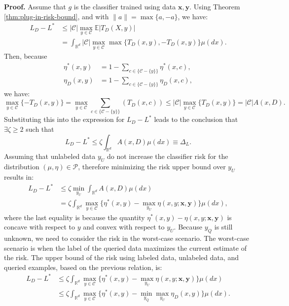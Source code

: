 	\textbf{Proof.} Assume that $g$ is the classifier trained using data $\mathbf{x}, \mathbf{y}$. Using Theorem \ref{thm:plug-in-risk-bound}, and with $\|a\| = \max\{a, -a\}$, we have:
	\begin{align}
		L_D - L^* &\le |\mathcal{C}| \max_{y \in \mathcal{C}} \mathbb{E}|T_D(X, y)| \\
		&= \int_{\mathbb{R}^d} |\mathcal{C}| \max_{y \in \mathcal{C}} \max\{T_D(x, y), -T_D(x, y)\} \mu(dx).
	\end{align}
	Then, because
	\begin{align}
		\eta^*(x, y) &= 1 - \sum_{c \in \{\mathcal{C} - \{y\}\}} \eta^*(x, c), \\
		\eta_D(x, y) &= 1 - \sum_{c \in \{\mathcal{C} - \{y\}\}} \eta_D(x, c),
	\end{align}
	we have:
	\begin{equation}
		\max_{y \in \mathcal{C}} \{ -T_D(x, y) \} = \max_{y \in \mathcal{C}} \sum_{c \in \{\mathcal{C} - \{y\}\}} (T_D(x, c)) \le |\mathcal{C}| \max_{y \in \mathcal{C}} \{ T_D(x, y) \} = |\mathcal{C}| A(x, D).
	\end{equation}
	Substituting this into the expression for $L_D - L^*$ leads to the conclusion that $\exists \zeta \ge 2$ such that
	\begin{equation}
		L_D - L^* \le \zeta \int_{\mathbb{R}^d} A(x, D) \mu(dx) \equiv \Delta_L.
	\end{equation}
	Assuming that unlabeled data $y_U$ do not increase the classifier risk for the distribution $(\mu, \eta) \in \mathcal{P}$, therefore minimizing the risk upper bound over $y_U$ results in:
	\begin{align}
		L_D - L^* &\le \zeta \min_{y_U} \int_{\mathbb{R}^d} A(x, D) \mu(dx) \\
		&= \zeta \int_{\mathbb{R}^d} \max_{y \in \mathcal{C}} \{ \eta^*(x, y) - \max_{y_U} \eta(x, y; \mathbf{x}, \mathbf{y}) \} \mu(dx),
	\end{align}
	where the last equality is because the quantity $\eta^*(x, y) - \eta(x, y; \mathbf{x}, \mathbf{y})$ is concave with respect to $y$ and convex with respect to $y_U$. Because $y_Q$ is still unknown, we need to consider the risk in the worst-case scenario. The worst-case scenario is when the label of the queried data maximizes the current estimate of the risk. The upper bound of the risk using labeled data, unlabeled data, and queried examples, based on the previous relation, is:
	\begin{align}
		L_D - L^* &\le \zeta \int_{\mathbb{R}^d} \max_{y \in \mathcal{C}} \{ \eta^*(x, y) - \max_{y_U} \eta(x, y; \mathbf{x}, \mathbf{y}) \} \mu(dx) \\
		&\le \zeta \int_{\mathbb{R}^d} \max_{y \in \mathcal{C}} \{ \eta^*(x, y) - \min_{y_Q} \max_{y_U} \eta_D(x, y) \} \mu(dx).
	\end{align}
